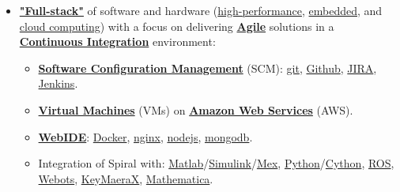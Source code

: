 \documentclass{article}
\begin{document}
\begin{itemize}
      \item \textbf{\href{https://www.google.com/search?q=full+stack+software&oq=full+stack+software&aqs=chrome..69i57.2623j0j7&sourceid=chrome&es_sm=122&ie=UTF-8}{"Full-stack"}} of software and hardware (\href{https://en.wikipedia.org/wiki/Supercomputer}{high-performance}, \href{https://en.wikipedia.org/wiki/Embedded_system}{embedded}, and \href{https://en.wikipedia.org/wiki/Cloud_computing}{cloud computing}) with a focus on delivering \textbf{\href{https://en.wikipedia.org/wiki/Agile_software_development}{Agile}} solutions in a \textbf{\href{http://en.wikipedia.org/wiki/Continuous_integration}{Continuous Integration}} environment:
      \begin{itemize}
        \item \textbf{\href{https://en.wikipedia.org/wiki/Software_configuration_management}{Software Configuration Management}} (SCM): \href{https://git-scm.com/}{git}, \href{https://github.com/spiralgen}{Github}, \href{https://www.atlassian.com/software/jira}{JIRA}, \href{http://jenkins-ci.org/}{Jenkins}.
        \item \textbf{\href{https://en.wikipedia.org/wiki/Virtual_machine}{Virtual Machines}} (VMs) on \textbf{\href{https://en.wikipedia.org/wiki/Amazon_Web_Services}{Amazon Web Services}} (AWS).
        \item \textbf{\href{https://dzone.com/articles/who-needs-online-ide}{WebIDE}}: \href{https://www.docker.com/}{Docker}, \href{https://www.nginx.com/resources/wiki/}{nginx}, \href{https://nodejs.org/en/}{nodejs}, \href{https://www.mongodb.org/}{mongodb}. 
        \item Integration of Spiral with: \href{http://www.mathworks.com/products/matlab/}{Matlab}/\href{http://www.mathworks.com/products/simulink/}{Simulink}/\href{http://www.mathworks.com/help/matlab/ref/mex.html}{Mex}, \href{https://www.python.org/}{Python}/\href{http://cython.org/}{Cython}, \href{http://www.ros.org/}{ROS}, \href{https://www.cyberbotics.com/overview}{Webots}, \href{http://www.ls.cs.cmu.edu/KeYmaeraX/}{KeyMaeraX}, \href{http://www.wolfram.com/mathematica/}{Mathematica}.
      \end{itemize}
    \end{itemize}



\end{document}
